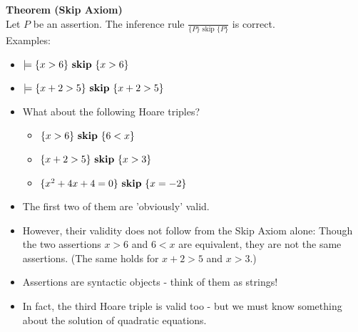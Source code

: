\begin{multicols}{2}
\textbf{Theorem (Skip Axiom)}\\
Let $P$ be an assertion. The inference rule $\frac{}{\{P\} \text{ skip } \{P\}}$ is correct.\\
Examples:
\begin{itemize}
  \item [\-] $\models \{x>6\} \text{ \textbf{skip} } \{x>6\}$
  \item [\-] $\models \{x+2>5\} \text{ \textbf{skip} } \{x+2>5\}$
\end{itemize}
\begin{itemize}
  \item What about the following Hoare triples?
  \begin{itemize}
    \item [\-] $\{x>6\} \text{ \textbf{skip} } \{6<x\}$
    \item [\-] $\{x+2>5\} \text{ \textbf{skip} } \{x>3\}$
    \item [\-] $\{x^2+4x+4=0\} \text{ \textbf{skip} } \{x=-2\}$
  \end{itemize}
  \item The first two of them are 'obviously' valid.
  \item However, their validity does not follow from the Skip Axiom alone: Though the two assertions $x>6$ and $6<x$ are equivalent, they are not the same assertions. (The same holds for $x+2>5$ and $x>3$.)
  \item Assertions are syntactic objects - think of them as strings!
  \item In fact, the third Hoare triple is valid too - but we must know something about the solution of quadratic equations.
\end{itemize}


\end{multicols}
